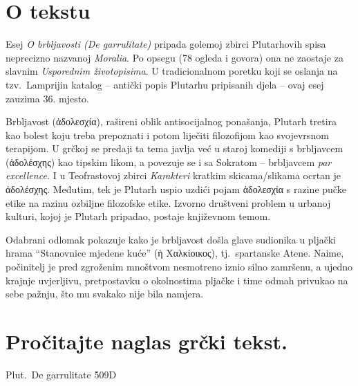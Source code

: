 


\section*{O tekstu}

Esej \textit{O brbljavosti (De garrulitate)} pripada golemoj zbirci Plutarhovih spisa neprecizno nazvanoj \textit{Moralia}. Po opsegu (78 ogleda i govora) ona ne zaostaje za slavnim \textit{Usporednim životopisima}. U tradicionalnom poretku koji se oslanja na tzv.\ Lamprijin katalog – antički popis Plutarhu pripisanih djela  –   ovaj esej zauzima 36. mjesto. 

Brbljavost \textgreek[variant=ancient]{(ἀδολεσχία),} rašireni oblik antisocijalnog ponašanja, Plutarh tretira kao bolest koju treba prepoznati i potom liječiti filozofijom kao svojevrsnom terapijom. U grčkoj se predaji ta tema javlja već u staroj komediji s brbljavcem \textgreek[variant=ancient]{(ἀδολέσχης)} kao tipskim likom, a povezuje se i sa Sokratom – brbljavcem \textit{par excellence.} I u Teofrastovoj zbirci \textit{Karakteri} kratkim skicama/slikama ocrtan je \textgreek[variant=ancient]{ἀδολέσχης.} Međutim, tek je Plutarh uspio uzdići pojam \textgreek[variant=ancient]{ἀδολεσχία} s razine pučke etike na razinu ozbiljne filozofske etike. Izvorno društveni problem u urbanoj kulturi, kojoj je Plutarh pripadao, postaje književnom temom.

Odabrani odlomak pokazuje kako je brbljavost došla glave sudionika u pljački hrama ``Stanovnice mjedene kuće'' \textgreek[variant=ancient]{(ἡ Χαλκίοικος),} tj.\ spartanske Atene. Naime, počinitelj je pred zgroženim mnoštvom nesmotreno iznio silno zamršenu, a ujedno krajnje uvjerljivu, pretpostavku o okolnostima pljačke i time odmah privukao na sebe pažnju, što mu svakako nije bila namjera.


\section*{Pročitajte naglas grčki tekst.}

Plut.\ De garrulitate 509D


\medskip


